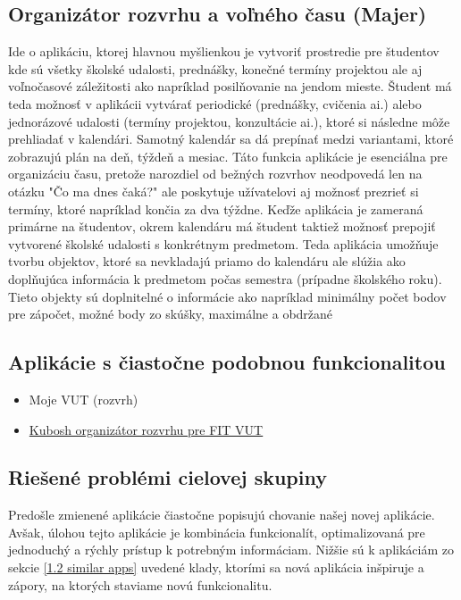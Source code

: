 \documentclass[a4paper, 11pt, onecolumn]{article}
\begin{document}
\subsection{Organizátor rozvrhu a voľného času (Majer)}
Ide o aplikáciu, ktorej hlavnou myšlienkou je vytvoriť prostredie pre študentov kde sú všetky školské 
udalosti, prednášky, konečné termíny projektou ale aj voľnočasové záležitosti ako napríklad posilňovanie 
na jendom mieste. Študent má teda možnosť v aplikácii vytvárať periodické (prednášky, cvičenia ai.)
alebo jednorázové udalosti (termíny projektou, konzultácie ai.), ktoré si následne môže prehliadať
v kalendári. Samotný kalendár sa dá prepínať medzi variantami, ktoré zobrazujú plán na deň, týždeň a 
mesiac. Táto funkcia aplikácie je esenciálna pre organizáciu času, pretože narozdiel od bežných 
rozvrhov neodpovedá len na otázku "Čo ma dnes čaká?" ale poskytuje užívatelovi aj možnosť prezrieť si
termíny, ktoré napríklad končia za dva týždne. Keďže aplikácia je zameraná primárne na študentov,
okrem kalendáru má študent taktiež možnosť prepojiť vytvorené školské udalosti s konkrétnym predmetom.
Teda aplikácia umožňuje tvorbu objektov, ktoré sa nevkladajú priamo do kalendáru ale slúžia ako 
doplňujúca informácia k predmetom počas semestra (prípadne školského roku). Tieto objekty sú doplnitelné
o informácie ako napríklad minimálny počet bodov pre zápočet, možné body zo skúšky, maximálne a obdržané 

\subsection*{Aplikácie s čiastočne podobnou funkcionalitou}
\label{1.2 similar apps}
\begin{itemize}
  \item Moje VUT (rozvrh)
  \item \href{https://www.kubosh.net/apps/fitsch/}{Kubosh organizátor rozvrhu pre FIT VUT}
\end{itemize}

\subsection*{Riešené problémi cielovej skupiny} 
Predošle zmienené aplikácie čiastočne popisujú chovanie našej novej aplikácie. Avšak, úlohou tejto 
aplikácie je kombinácia funkcionalít, optimalizovaná pre jednoduchý a rýchly prístup k potrebným
informáciam. Nižšie sú k aplikáciám zo sekcie \ref{1.2 similar apps} uvedené klady, ktorími sa nová aplikácia 
inšpiruje a zápory, na ktorých staviame novú funkcionalitu.
\end{document}
